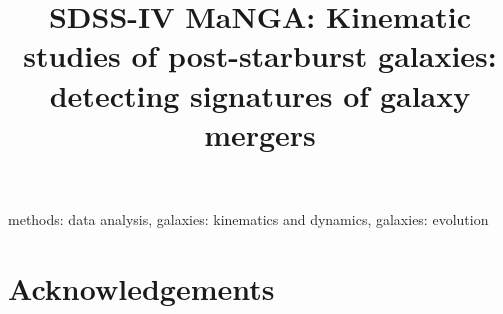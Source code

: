 \documentclass[fleqn,usenatbib]{mnras} %
\title[Kinematics of post-starburst galaxies]{SDSS-IV MaNGA: Kinematic studies of post-starburst galaxies: detecting signatures of galaxy mergers}
\begin{document}



\begingroup
\let\clearpage\relax
\tableofcontents
\listoftables
\listoffigures
\endgroup



\label{firstpage}
\pagerange{\pageref{firstpage}--\pageref{lastpage}}
\maketitle

\newpage

\begin{abstract}

\end{abstract}

\begin{keywords}
methods: data analysis, galaxies: kinematics and dynamics, galaxies: evolution
\end{keywords}









% 



\section*{Acknowledgements}



 

\appendix






\bsp	%
\label{lastpage}
\end{document}
